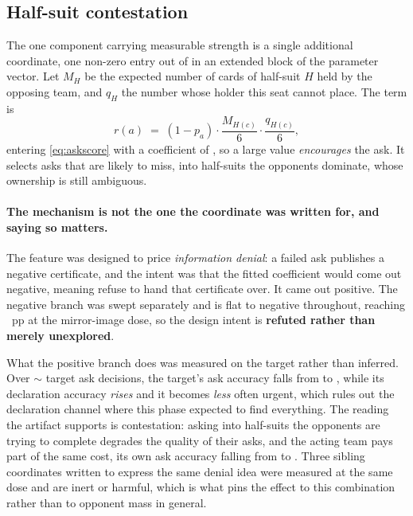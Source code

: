 \subsection{Half-suit contestation}
\label{sec:agent-contest}

The one component carrying measurable strength is a single additional coordinate, one non-zero entry
out of \vsevenResponderTotal{} in an extended block of the parameter vector. Let $M_H$ be the expected number of cards of half-suit $H$ held by the
opposing team, and $q_H$ the number whose holder this seat cannot place. The term is
\begin{equation}
  r(a) \;=\; (1 - p_a)\cdot\frac{M_{H(c)}}{6}\cdot\frac{q_{H(c)}}{6},
  \label{eq:contest}
\end{equation}
entering \eqref{eq:askscore} with a \vsevenContestSign{} coefficient of
\texttt{\vsevenContestWeight{}}, so a large value \emph{encourages} the ask. It selects asks that are
likely to miss, into half-suits the opponents dominate, whose ownership is still ambiguous.

\paragraph{The mechanism is not the one the coordinate was written for, and saying so matters.} The
feature was designed to price \emph{information denial}: a failed ask publishes a negative
certificate, and the intent was that the fitted coefficient would come out negative, meaning refuse
to hand that certificate over. It came out positive. The negative branch was swept separately and is
flat to negative throughout, reaching \vsevenContestNegDose{}~pp at the mirror-image dose, so the design intent is
\textbf{refuted rather than merely unexplored}.

What the positive branch does was measured on the target rather than inferred. Over $\sim$\vsevenContestDecisions{}
target ask decisions, the target's ask accuracy falls from \vsevenContestTargetAskBefore{} to
\vsevenContestTargetAskAfter{}, while its declaration
accuracy \emph{rises} and it becomes \emph{less} often urgent, which rules out the declaration
channel where this phase expected to find everything. The reading the artifact supports is
contestation: asking into half-suits the opponents are trying to complete degrades the quality of
their asks, and the acting team pays part of the same cost, its own ask accuracy falling from
\vsevenContestSelfAskBefore{} to \vsevenContestSelfAskAfter{}. Three sibling coordinates written to express the same denial idea were measured
at the same dose and are inert or harmful, which is what pins the effect to this combination rather
than to opponent mass in general.

